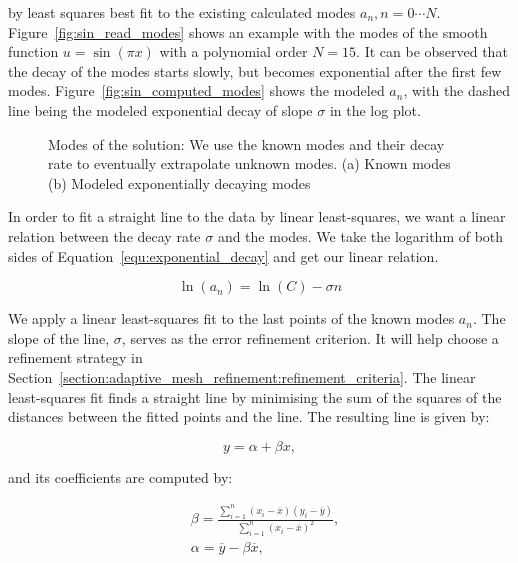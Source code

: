 \noindent
by least squares best fit to the existing calculated modes \(a_n, n = 0 \cdots N\).
Figure~\ref{fig:sin_read_modes} shows an example with the modes of the smooth function \(u =
\sin(\pi x)\) with a polynomial order \(N = 15\). It can be observed that the decay of the modes
starts slowly, but becomes exponential after the first few modes.
Figure~\ref{fig:sin_computed_modes} shows the modeled \(a_n\), with the dashed line being the
modeled exponential decay of slope \( \sigma \) in the log plot. 

\begin{figure}[H]
    \centering
    \hfill
    \caption{Modes of the solution: We use the known modes and their decay rate to eventually
    extrapolate unknown modes. (a) Known modes (b) Modeled exponentially decaying modes}\label{fig:sin_modes}
\end{figure}

In order to fit a straight line to the data by linear least-squares, we want a linear relation
between the decay rate \(\sigma \) and the modes. We take the logarithm of both sides of
Equation~\ref{equ:exponential_decay} and get our linear relation.

\begin{equation} \label{equ:exponential_decay_linear}
    \ln(a_n) = \ln(C) - \sigma n
\end{equation}

\noindent
We apply a linear least-squares fit to the last points of the known modes \(a_n\). The slope of the
line, \(\sigma \), serves as the error refinement criterion. It will help choose a refinement
strategy in Section~\ref{section:adaptive_mesh_refinement:refinement_criteria}. The linear
least-squares fit finds a straight line by minimising the sum of the squares of the distances
between the fitted points and the line. The resulting line is given by:

\begin{equation}
    y = \alpha + \beta x,
\end{equation}

\noindent
and its coefficients are computed by:

\begin{align}
    & \beta = \frac{\sum_{i = 1}^{n}(x_i - \overline{x})(y_i - \overline{y})}{\sum_{i = 1}^{n}{(x_i -\overline{x})}^2}, \\
    & \alpha = \overline{y} - \beta \overline{x},
\end{align}

